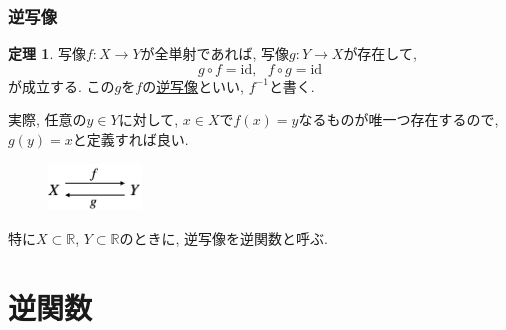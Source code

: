 \documentclass[dvipdfmx,cjk,10.2pt]{beamer}
\newcommand{\R}{\mathbb{R}}
\newcommand{\id}{\mathrm{id}}
\theoremstyle{definition}
\newtheorem{Thm}{定理}[section]
\newtheorem{Prob}[Thm]{問題}
\begin{document}
\begin{frame}
\frametitle{逆写像}


\begin{Thm}
写像$f:X\rightarrow Y$が全単射であれば, 写像$g:Y\rightarrow X$が存在して, 
$$
g\circ f = \id, \ \ \ f \circ g = \id
$$
が成立する. 
この$g$を$f$の\underline{逆写像}といい, $f^{-1}$と書く. 
\end{Thm}

実際, 任意の$y \in Y$に対して, $x \in X$で$f(x)=y$なるものが唯一つ存在するので, $g(y)=x$と定義すれば良い. 
\vspace{-4mm}

 \begin{figure}[htbp]
 \begin{center} 
  \includegraphics[width=25mm]{inverse.png}
 \end{center}
\end{figure}

\vspace{-2mm}

特に$X \subset \R$, $Y \subset \R$のときに, 逆写像を逆関数と呼ぶ. 

\end{frame}





%
%
%




\section{逆関数}
\end{document}
